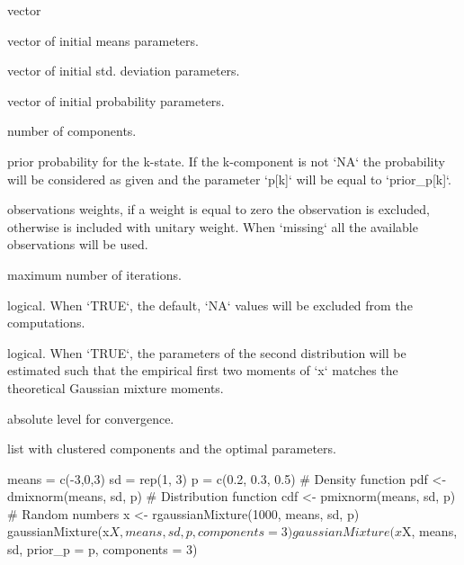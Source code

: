\documentclass[a4paper]{book}
\begin{document}
\begin{Arguments}
\begin{ldescription}
\item[\code{x}] vector

\item[\code{means}] vector of initial means parameters.

\item[\code{sd}] vector of initial std. deviation parameters.

\item[\code{p}] vector of initial probability parameters.

\item[\code{components}] number of components.

\item[\code{prior\_p}] prior probability for the k-state. If the k-component is not `NA` the probability will be considered as given and
the parameter `p[k]` will be equal to `prior\_p[k]`.

\item[\code{weights}] observations weights, if a weight is equal to zero the observation is excluded, otherwise is included with unitary weight.
When `missing` all the available observations will be used.

\item[\code{maxit}] maximum number of iterations.

\item[\code{na.rm}] logical. When `TRUE`, the default, `NA` values will be excluded from the computations.

\item[\code{match\_moments}] logical. When `TRUE`, the parameters of the second distribution will be estimated such that
the empirical first two moments of `x` matches the theoretical Gaussian mixture moments.

\item[\code{absotol}] absolute level for convergence.
\end{ldescription}
\end{Arguments}
%
\begin{Value}
list with clustered components and the optimal parameters.
\end{Value}
%
\begin{Examples}
\begin{ExampleCode}
means = c(-3,0,3)
sd = rep(1, 3)
p = c(0.2, 0.3, 0.5)
# Density function
pdf <- dmixnorm(means, sd, p)
# Distribution function
cdf <- pmixnorm(means, sd, p)
# Random numbers
x <- rgaussianMixture(1000, means, sd, p)
gaussianMixture(x$X, means, sd, p, components = 3)
gaussianMixture(x$X, means, sd, prior_p = p, components = 3)
\end{ExampleCode}
\end{Examples}
\end{document}
